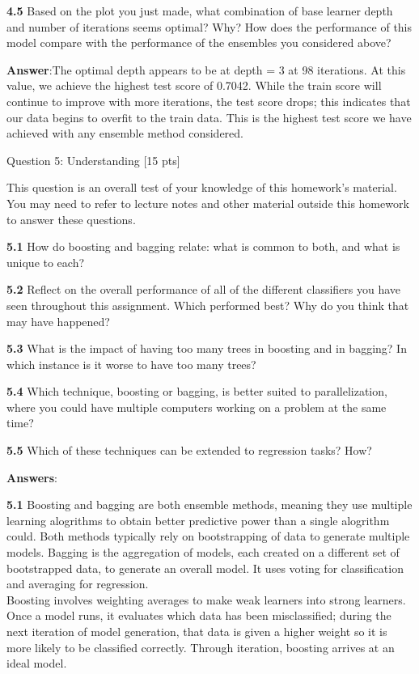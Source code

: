 \documentclass[11pt]{article}
\begin{document}
    \textbf{4.5} Based on the plot you just made, what combination of base
learner depth and number of iterations seems optimal? Why? How does the
performance of this model compare with the performance of the ensembles
you considered above?

    \textbf{Answer}:The optimal depth appears to be at depth = 3 at 98
iterations. At this value, we achieve the highest test score of 0.7042.
While the train score will continue to improve with more iterations, the
test score drops; this indicates that our data begins to overfit to the
train data. This is the highest test score we have achieved with any
ensemble method considered.

     Question 5: Understanding {[}15 pts{]}

This question is an overall test of your knowledge of this homework's
material. You may need to refer to lecture notes and other material
outside this homework to answer these questions.

    \textbf{5.1} How do boosting and bagging relate: what is common to both,
and what is unique to each?

\textbf{5.2} Reflect on the overall performance of all of the different
classifiers you have seen throughout this assignment. Which performed
best? Why do you think that may have happened?

\textbf{5.3} What is the impact of having too many trees in boosting and
in bagging? In which instance is it worse to have too many trees?

\textbf{5.4} Which technique, boosting or bagging, is better suited to
parallelization, where you could have multiple computers working on a
problem at the same time?

\textbf{5.5} Which of these techniques can be extended to regression
tasks? How?

    \textbf{Answers}:

    \textbf{5.1} Boosting and bagging are both ensemble methods, meaning
they use multiple learning alogrithms to obtain better predictive power
than a single alogrithm could. Both methods typically rely on
bootstrapping of data to generate multiple models. Bagging is the
aggregation of models, each created on a different set of bootstrapped
data, to generate an overall model. It uses voting for classification
and averaging for regression.\\
Boosting involves weighting averages to make weak learners into strong
learners. Once a model runs, it evaluates which data has been
misclassified; during the next iteration of model generation, that data
is given a higher weight so it is more likely to be classified
correctly. Through iteration, boosting arrives at an ideal model.
\end{document}
